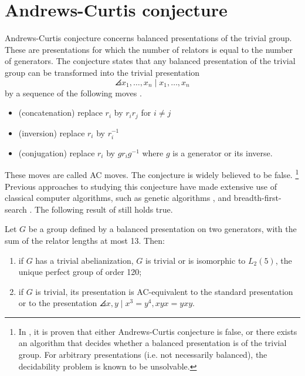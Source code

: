 
\section{Andrews-Curtis conjecture\label{sec:AC}}

Andrews-Curtis conjecture concerns balanced presentations
of the trivial group.
These are presentations for which the number of relators is
equal to the number of generators.
The conjecture states that any balanced presentation of the trivial group can be transformed into the trivial presentation
\[
\angles{x_1, \dots, x_n \mid x_1, \dots, x_n}
\]
by a sequence of the following moves \cite{Andrews-Curtis}.

\begin{itemize}
	\item (concatenation) replace $r_i$ by $r_i r_j$ for $i \neq j$
	\item (inversion) replace $r_i$ by $r_i^{-1}$
	\item (conjugation) replace $r_i$ by $g r_i g^{-1}$ where $g$ is a generator or its inverse.
\end{itemize}

These moves are called AC moves.
The conjecture is widely believed to be false.
\footnote{In \cite{decidability}, it is proven that either Andrews-Curtis conjecture is false, or there exists an algorithm that decides whether a balanced presentation is of the trivial group.
For arbitrary presentations (i.e. not necessarily balanced), the decidability problem is known to be unsolvable.
}
Previous approaches to studying this conjecture have made extensive use of classical computer algorithms, such as genetic algorithms \cite{genetic}, and breadth-first-search  \cite{bfs-ac}.
The following result of \cite{bfs-ac} still holds true.

\begin{theorem}
	Let $G$ be a group defined by a balanced presentation on two generators, with the sum
	of the relator lengths at most 13.
	Then:
	\begin{enumerate}[label=(\roman*)]
		\item if $G$ has a trivial abelianization, $G$ is trivial or is isomorphic to $L_2(5)$, the unique perfect
		group of order 120;
		\item if $G$ is trivial, its presentation is AC-equivalent to the standard presentation or to the presentation
		$\angles{x, y \mid x^3 = y^4, xyx = yxy}$.
	\end{enumerate}
\end{theorem}

